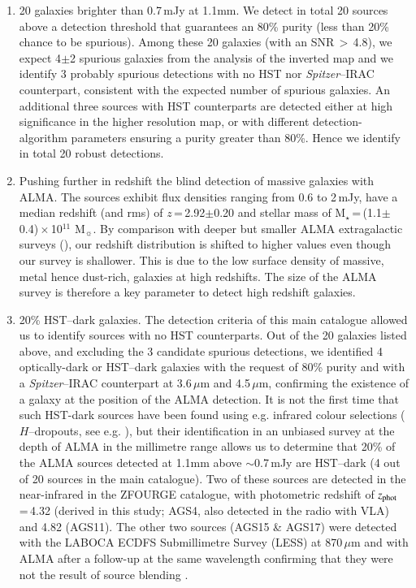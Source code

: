 \documentclass[longauth]{aa}
\begin{document}
\begin{enumerate}
\item 20 galaxies brighter than 0.7\,mJy at 1.1mm. We detect in total 20 sources above a detection threshold that guarantees an 80\% purity (less than 20\% chance to be spurious). Among these 20 galaxies (with an SNR\,$>$\,4.8), we expect 4$\pm$2 spurious galaxies from the analysis of the inverted map and we identify 3 probably spurious detections with no HST nor \textit{Spitzer}--IRAC counterpart, consistent with the expected number of spurious galaxies. An additional three sources with HST counterparts are detected either at high significance in the higher resolution map, or with different detection-algorithm parameters ensuring a purity greater than 80\%. Hence we identify in total 20 robust detections.

\item Pushing further in redshift the blind detection of massive galaxies with ALMA. The sources exhibit flux densities ranging from 0.6 to 2\,mJy, have a median redshift (and rms) of $z$\,=\,2.92$\pm$0.20 and stellar mass of M$_{\star}$\,=\,(1.1$\pm$0.4)\,$\times$\,10$^{11}$ M$_\sun$. By comparison with deeper but smaller ALMA extragalactic surveys (\citealt{Aravena2016,Dunlop2017,Gonzalez-Lopez2017, Ueda2018}), our redshift distribution is shifted to higher values even though our survey is shallower. This is due to the low surface density of massive, metal hence dust-rich, galaxies at high redshifts. The size of the ALMA survey is therefore a key parameter to detect high redshift galaxies.

\item 20\% HST--dark galaxies. The detection criteria of this main catalogue allowed us to identify sources with no HST counterparts. Out of the 20 galaxies listed above, and excluding the 3 candidate spurious detections, we identified 4 optically-dark or HST--dark galaxies with the request of 80\% purity and with a \textit{Spitzer}--IRAC counterpart at 3.6\,$\mu$m and 4.5\,$\mu$m, confirming the existence of a galaxy at the position of the ALMA detection. It is not the first time that such HST-dark sources have been found using e.g. infrared colour selections ($H$--dropouts, see e.g. \citealt{Wang2016}), but their identification in an unbiased survey at the depth of ALMA in the millimetre range allows us to determine that 20\% of the ALMA sources detected at 1.1mm above $\sim$0.7\,mJy are HST--dark (4 out of 20 sources in the main catalogue). Two of these sources are detected in the near-infrared in the ZFOURGE catalogue, with photometric redshift of $z_{\rm phot}$\,=\,4.32 (derived in this study; AGS4, also detected in the radio with VLA) and 4.82 (AGS11). The other two sources (AGS15 \& AGS17) were detected with the LABOCA ECDFS Submillimetre Survey (LESS) at 870\,$\mu$m and with ALMA after a follow-up at the same wavelength confirming that they were not the result of source blending \citep{Hodge2013}. 


\end{enumerate}
\end{document}
